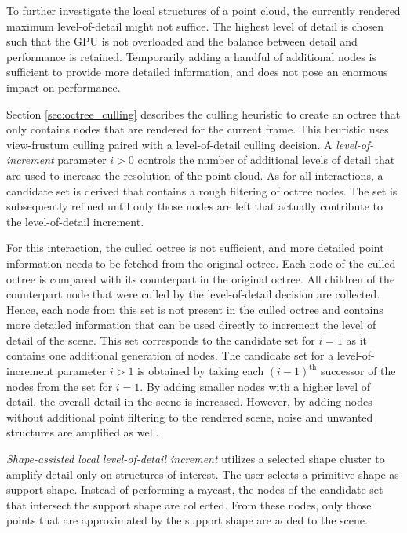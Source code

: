 To further investigate the local structures of a point cloud, the currently rendered maximum level-of-detail might not suffice. The highest level of detail is chosen such that the GPU is not overloaded and the balance between detail and performance is retained. Temporarily adding a handful of additional nodes is sufficient to provide more detailed information, and does not pose an enormous impact on performance. 
    
\par

Section \ref{sec:octree_culling} describes the culling heuristic to create an octree that only contains nodes that are rendered for the current frame. This heuristic uses view-frustum culling paired with a level-of-detail culling decision. A \textit{level-of-increment} parameter $i > 0$ controls the number of additional levels of detail that are used to increase the resolution of the point cloud. As for all interactions, a candidate set is derived that contains a rough filtering of octree nodes. The set is subsequently refined until only those nodes are left that actually contribute to the level-of-detail increment. 

\par

For this interaction, the culled octree is not sufficient, and more detailed point information needs to be fetched from the original octree. Each node of the culled octree is compared with its counterpart in the original octree. All children of the counterpart node that were culled by the level-of-detail decision are collected. Hence, each node from this set is not present in the culled octree and contains more detailed information that can be used directly to increment the level of detail of the scene. This set corresponds to the candidate set for $i = 1$ as it contains one additional generation of nodes. The candidate set for a level-of-increment parameter $i > 1$ is obtained by taking each $(i-1)^{\text{th}}$ successor of the nodes from the set for $i = 1$. By adding smaller nodes with a higher level of detail, the overall detail in the scene is increased. However, by adding nodes without additional point filtering to the rendered scene, noise and unwanted structures are amplified as well. 

\par
    
\textit{Shape-assisted local level-of-detail increment} utilizes a selected shape cluster to amplify detail only on structures of interest. The user selects a primitive shape as support shape. Instead of performing a raycast, the nodes of the candidate set that intersect the support shape are collected. From these nodes, only those points that are approximated by the support shape are added to the scene. 
    
